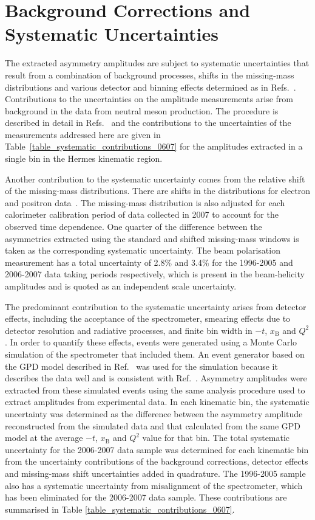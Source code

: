 \section{Background Corrections and Systematic Uncertainties}
The extracted asymmetry amplitudes are subject to systematic uncertainties that
result from a combination of background processes, 
shifts in the missing-mass distributions and various detector and binning
effects determined as in Refs.~\cite{Air08,Air09}. Contributions to the uncertainties on the amplitude measurements arise from background in the data from neutral meson production. The procedure is described in detail in Refs.~\cite{Air08,Air09} and the contributions to the uncertainties of the measurements addressed here are given in Table~\ref{table_systematic_contributions_0607} for the amplitudes extracted in a single bin in the H{\sc ermes} kinematic region. 

Another contribution to the systematic uncertainty comes from the relative shift of the
missing-mass distributions. There are shifts in the distributions for electron and positron data~\cite{Zei09,Bur10}. The missing-mass
distribution is also adjusted for each calorimeter calibration period of data
collected in 2007 to account for the observed time dependence. One
quarter of the difference between the asymmetries extracted using the standard
and shifted missing-mass windows is taken as the corresponding systematic
uncertainty. The beam polarisation measurement has a total uncertainty of 2.8\% and 3.4\% for the 1996-2005 and 2006-2007 data taking periods respectively,
which is present in the beam-helicity amplitudes and is quoted as an
independent scale uncertainty.

The predominant contribution to the systematic uncertainty arises from detector
effects, including the acceptance of the spectrometer, smearing effects due to detector resolution and radiative processes, and
finite bin width in $-t$, $x_{\textrm{B}}$ and $Q^{2}$. In order to quantify
these effects, events were generated using a Monte Carlo simulation of
the spectrometer that included them. An event
generator based on the GPD model described in Ref.~\cite{Guz06} was used for the simulation because it describes the data well and is consistent with Ref.~\cite{Air09}. Asymmetry amplitudes were extracted from these simulated events using the same analysis
procedure used to extract amplitudes from experimental data. In each kinematic
bin, the systematic uncertainty was determined as the difference between the
asymmetry amplitude reconstructed from the simulated data and that
calculated from the same GPD model at the average $-t$, $x_{\textrm{B}}$ and
$Q^{2}$ value for that bin.
The total systematic uncertainty for the 2006-2007 data sample was
determined for each kinematic bin from the uncertainty contributions of the
background corrections, detector effects and missing-mass shift
uncertainties added in quadrature. 
The 1996-2005 sample also has a systematic uncertainty from misalignment of the spectrometer, 
which has been eliminated for the 2006-2007 data sample.
These contributions are summarised in Table
\ref{table_systematic_contributions_0607}.

